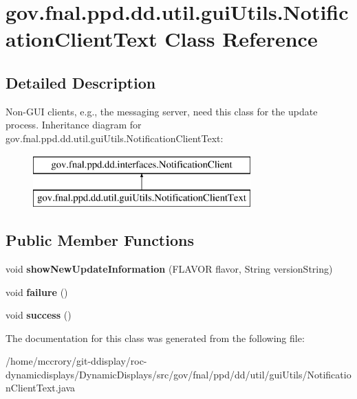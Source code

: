 \hypertarget{classgov_1_1fnal_1_1ppd_1_1dd_1_1util_1_1guiUtils_1_1NotificationClientText}{\section{gov.\-fnal.\-ppd.\-dd.\-util.\-gui\-Utils.\-Notification\-Client\-Text Class Reference}
\label{classgov_1_1fnal_1_1ppd_1_1dd_1_1util_1_1guiUtils_1_1NotificationClientText}
}


\subsection{Detailed Description}
Non-\/\-G\-U\-I clients, e.\-g., the messaging server, need this class for the update process. Inheritance diagram for gov.\-fnal.\-ppd.\-dd.\-util.\-gui\-Utils.\-Notification\-Client\-Text\-:\begin{figure}[H]
\begin{center}
\leavevmode
\includegraphics[height=2.000000cm]{classgov_1_1fnal_1_1ppd_1_1dd_1_1util_1_1guiUtils_1_1NotificationClientText}
\end{center}
\end{figure}
\subsection*{Public Member Functions}
\begin{DoxyCompactItemize}
\item 
\hypertarget{classgov_1_1fnal_1_1ppd_1_1dd_1_1util_1_1guiUtils_1_1NotificationClientText_ab4879ecf03b2d00f8d4e085c8bd41f0a}{void {\bfseries show\-New\-Update\-Information} (F\-L\-A\-V\-O\-R flavor, String version\-String)}\label{classgov_1_1fnal_1_1ppd_1_1dd_1_1util_1_1guiUtils_1_1NotificationClientText_ab4879ecf03b2d00f8d4e085c8bd41f0a}

\item 
\hypertarget{classgov_1_1fnal_1_1ppd_1_1dd_1_1util_1_1guiUtils_1_1NotificationClientText_a60f0c1ad444844a27c015753fd23f54a}{void {\bfseries failure} ()}\label{classgov_1_1fnal_1_1ppd_1_1dd_1_1util_1_1guiUtils_1_1NotificationClientText_a60f0c1ad444844a27c015753fd23f54a}

\item 
\hypertarget{classgov_1_1fnal_1_1ppd_1_1dd_1_1util_1_1guiUtils_1_1NotificationClientText_a8de8c375474d901a6554bd3c39d4cf46}{void {\bfseries success} ()}\label{classgov_1_1fnal_1_1ppd_1_1dd_1_1util_1_1guiUtils_1_1NotificationClientText_a8de8c375474d901a6554bd3c39d4cf46}

\end{DoxyCompactItemize}


The documentation for this class was generated from the following file\-:\begin{DoxyCompactItemize}
\item 
/home/mccrory/git-\/ddisplay/roc-\/dynamicdisplays/\-Dynamic\-Displays/src/gov/fnal/ppd/dd/util/gui\-Utils/Notification\-Client\-Text.\-java\end{DoxyCompactItemize}
